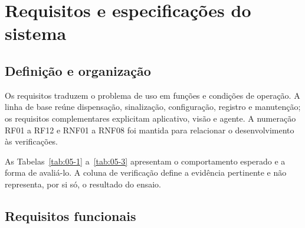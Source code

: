\section{Requisitos e especificações do sistema}\label{cap:requisitos}
\subsection{Definição e organização}
Os requisitos traduzem o problema de uso em funções e condições de operação. A linha de base reúne dispensação, sinalização, configuração, registro e manutenção; os requisitos complementares explicitam aplicativo, visão e agente. A numeração RF01 a RF12 e RNF01 a RNF08 foi mantida para relacionar o desenvolvimento às verificações. 

As Tabelas~\ref{tab:05-1} a~\ref{tab:05-3} apresentam o comportamento esperado e a forma de avaliá-lo. A coluna de verificação define a evidência pertinente e não representa, por si só, o resultado do ensaio.

\subsection{Requisitos funcionais}

